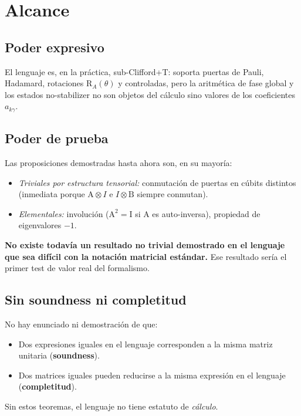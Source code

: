 \documentclass[12pt, a4paper]{article}
\newcommand{\gate}[1]{\text{#1}}
\newcommand{\con}[1]{\textit{#1}}
\begin{document}
\section{Alcance}

\subsection{Poder expresivo}

El lenguaje es, en la práctica, sub-Clifford+T: soporta puertas de Pauli,
Hadamard, rotaciones $\gate{R}_A(\theta)$ y controladas, pero la aritmética de
fase global y los estados no-stabilizer no son objetos del cálculo sino valores
de los coeficientes $a_{k\gamma}$.

\subsection{Poder de prueba}

Las proposiciones demostradas hasta ahora son, en su mayoría:
\begin{itemize}
  \item \con{Triviales por estructura tensorial:} conmutación de puertas en
        cúbits distintos (inmediata porque $\gate{A} \otimes I$ e $I \otimes \gate{B}$
        siempre conmutan).
  \item \con{Elementales:} involución ($\gate{A}^2 = \gate{I}$ si $\gate{A}$
        es auto-inversa), propiedad de eigenvalores $-1$.
\end{itemize}

\textbf{No existe todavía un resultado no trivial demostrado en el lenguaje
  que sea difícil con la notación matricial estándar.}
Ese resultado sería el primer test de valor real del formalismo.

\subsection{Sin soundness ni completitud}

No hay enunciado ni demostración de que:
\begin{itemize}
  \item Dos expresiones iguales en el lenguaje corresponden a la misma
        matriz unitaria (\textbf{soundness}).
  \item Dos matrices iguales pueden reducirse a la misma expresión en el
        lenguaje (\textbf{completitud}).
\end{itemize}
Sin estos teoremas, el lenguaje no tiene estatuto de \emph{cálculo}.
\end{document}
